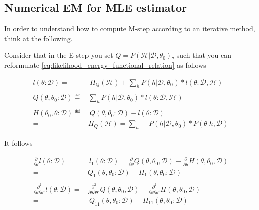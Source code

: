 \documentclass[11pt]{article}
\begin{document}
\begin{article}
\subsection{Numerical EM for MLE estimator}
\label{sec:org059d778}

In order to understand how to compute M-step according to an
iterative method, think at the following.

Consider that in the E-step you set \(Q = P (\mathscr{H}| \mathscr{D}, \theta_0)\), such
that you can reformulate
\ref{eq:likelihood_energy_functional_relation} as follows

\begin{align} \label{eq:likelihood_energy_iterative}
l (\theta: \mathscr{D}) =& \ H_Q (\mathscr {H}) + \sum_h P(h | \mathscr{D}, \theta_0) * l (\theta: \mathscr{D}, \mathscr{H}) \\
\nonumber\\
Q(\theta, \theta_0 : \mathscr{D}) \eqdef& \sum_h P(h | \mathscr{D}, \theta_0) * l (\theta: \mathscr{D}, \mathscr{H})\\
\nonumber\\  
H(\theta_0, \theta: \mathscr{D}) \eqdef& \ Q(\theta, \theta_0 : \mathscr{D}) - l (\theta: \mathscr{D}) \\
                                 =& H_Q (\mathscr {H}) = \sum_h - P(h | \mathscr{D}, \theta_0) * P(\theta | h, \mathscr{D}) \nonumber
\end{align}

It follows

\begin{align} 
\frac{\partial}{\partial \theta} l (\theta: \mathscr{D}) =& \ l_1 (\theta: \mathscr{D}) = \frac{\partial}{\partial \theta} Q(\theta, \theta_0, \mathscr{D}) - \frac{\partial}{\partial \theta} H(\theta, \theta_0, \mathscr{D}) \nonumber \\
=& Q_1(\theta, \theta_0 : \mathscr{D}) - H_1(\theta, \theta_0 : \mathscr{D})  \label{eq:m-condition-iterative1} \\
\nonumber \\
\frac{\partial^2}{\partial \theta \partial \theta'} l (\theta: \mathscr{D}) =& \frac{\partial^2}{\partial \theta \partial \theta'}  Q(\theta, \theta_0, \mathscr{D}) -  \frac{\partial^2}{\partial \theta \partial \theta'}  H(\theta, \theta_0, \mathscr{D}) \nonumber \\
  =& \ Q_{11}(\theta, \theta_0 : \mathscr{D}) - H_{11}(\theta, \theta_0 : \mathscr{D}) \label{eq:m-condition-iterative2}
\end{align}


\end{article}
\end{document}
